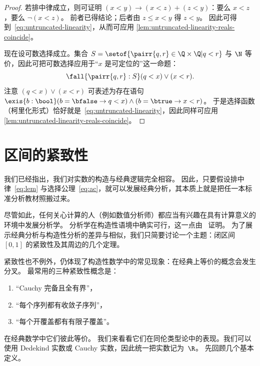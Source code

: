 \begin{proof}
  若排中律成立，则可证明 $(x < y) \to (x < z) + (z < y)$：要么 $x < z$，要么 $\lnot (x < z)$。
  前者已得结论；后者由 $z \leq x < y$ 得 $z < y$。
  因此可得到~\eqref{eq:untruncated-linearity}，从而可应用 \cref{lem:untruncated-linearity-reals-coincide}。

  现在设可数选择成立。集合
  $S = \setof{ \pairr{q, r} \in \Q \times \Q | q <
    r }$
  与 $\N$ 等价，因此可把可数选择应用于“$x$ 是可定位的”这一命题：
  \begin{equation*}
    \fall{\pairr{q, r} : S} (q < x) \lor (x < r).
  \end{equation*}
  注意 $(q < x) \lor (x < r)$ 可表述为存在语句
  $\exis{b :
    \bool} (b = \bfalse \to q < x) \land (b = \btrue \to x < r)$。
  于是选择函数（柯里化形式）恰好就是~\eqref{eq:untruncated-linearity}，因此同样可应用
  \cref{lem:untruncated-linearity-reals-coincide}。
\end{proof}

%
%
%

\section{区间的紧致性}
\label{sec:compactness-interval}

%
%

我们已经指出，我们对实数的构造与经典逻辑完全相容。
因此，只要假设排中律~\eqref{eq:lem} 与选择公理~\eqref{eq:ac}，就可以发展经典分析，其本质上就是把任一本标准分析教材照搬过来。

%
%
尽管如此，任何关心计算的人（例如数值分析师）都应当有兴趣在具有计算意义的环境中发展分析学。
分析学在构造性语境中确实可行，这一点由~\cite{Bishop1967} 证明。
为了展示经典分析与构造性分析的差异与相似，我们只简要讨论一个主题：闭区间
$[0,1]$ 的紧致性及其周边的几个定理。

紧致性也不例外，仍体现了构造性数学中的常见现象：在经典上等价的概念会发生分叉。
最常用的三种紧致性概念是：
%
%
\begin{enumerate}
\item {}“Cauchy 完备且全有界”，
\item {}“每个序列都有收敛子序列”，
\item {}“每个开覆盖都有有限子覆盖”。
\end{enumerate}
%
在经典数学中它们彼此等价。
我们来看看它们在同伦类型论中的表现。我们可以使用 Dedekind 实数或 Cauchy 实数，因此统一把实数记为~$\R$。
先回顾几个基本定义。

